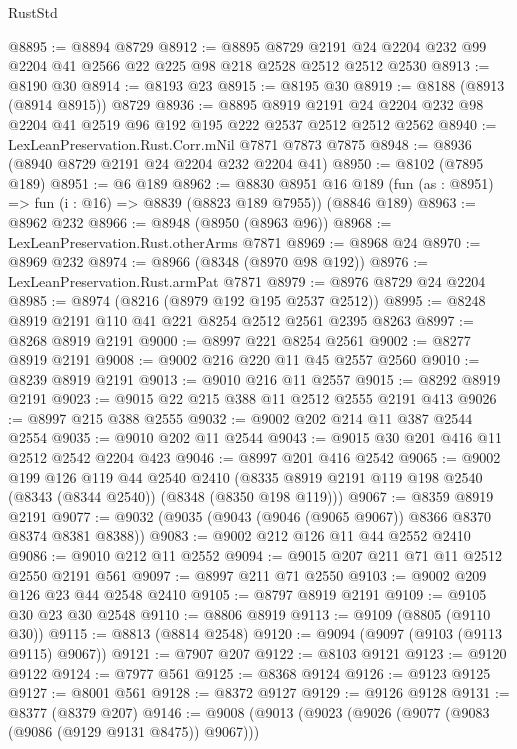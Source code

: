 \begin{lexlean}{RustStd}
\begin{coremodule}
{\begin{coremodule}
{{{{{{{{{{{{{{{{{{{{{{{{{{{{{{{{{{{{{{{{{{{{{{{{{{@8895 := @8894 @8729
@8912 := @8895
    @8729
    @2191
    @24
    @2204
    @232
    @99
    @2204
    @41
    @2566
    @22
    @225
    @98
    @218
    @2528
    @2512
    @2512
    @2530
@8913 := @8190 @30
@8914 := @8193 @23
@8915 := @8195 @30
@8919 := @8188 (@8913 (@8914 @8915)) @8729
@8936 := @8895
    @8919
    @2191
    @24
    @2204
    @232
    @98
    @2204
    @41
    @2519
    @96
    @192
    @195
    @222
    @2537
    @2512
    @2512
    @2562
@8940 := LexLeanPreservation.Rust.Corr.mNil @7871 @7873 @7875
@8948 := @8936 (@8940 @8729 @2191 @24 @2204 @232 @2204 @41)
@8950 := @8102 (@7895 @189)
@8951 := @6 @189
@8962 := @8830
    @8951
    @16
    @189
    (fun (as : @8951) => fun (i : @16) => @8839 (@8823 @189 @7955))
    (@8846 @189)
@8963 := @8962 @232
@8966 := @8948 (@8950 (@8963 @96))
@8968 := LexLeanPreservation.Rust.otherArms @7871
@8969 := @8968 @24
@8970 := @8969 @232
@8974 := @8966 (@8348 (@8970 @98 @192))
@8976 := LexLeanPreservation.Rust.armPat @7871
@8979 := @8976 @8729 @24 @2204
@8985 := @8974 (@8216 (@8979 @192 @195 @2537 @2512))
@8995 := @8248 @8919 @2191 @110 @41 @221 @8254 @2512 @2561 @2395 @8263
@8997 := @8268 @8919 @2191
@9000 := @8997 @221 @8254 @2561
@9002 := @8277 @8919 @2191
@9008 := @9002 @216 @220 @11 @45 @2557 @2560
@9010 := @8239 @8919 @2191
@9013 := @9010 @216 @11 @2557
@9015 := @8292 @8919 @2191
@9023 := @9015 @22 @215 @388 @11 @2512 @2555 @2191 @413
@9026 := @8997 @215 @388 @2555
@9032 := @9002 @202 @214 @11 @387 @2544 @2554
@9035 := @9010 @202 @11 @2544
@9043 := @9015 @30 @201 @416 @11 @2512 @2542 @2204 @423
@9046 := @8997 @201 @416 @2542
@9065 := @9002
    @199
    @126
    @119
    @44
    @2540
    @2410
    (@8335 @8919 @2191 @119 @198 @2540 (@8343 (@8344 @2540)) (@8348 (@8350 @198 @119)))
@9067 := @8359 @8919 @2191
@9077 := @9032 (@9035 (@9043 (@9046 (@9065 @9067)) @8366 @8370 @8374 @8381 @8388))
@9083 := @9002 @212 @126 @11 @44 @2552 @2410
@9086 := @9010 @212 @11 @2552
@9094 := @9015 @207 @211 @71 @11 @2512 @2550 @2191 @561
@9097 := @8997 @211 @71 @2550
@9103 := @9002 @209 @126 @23 @44 @2548 @2410
@9105 := @8797 @8919 @2191
@9109 := @9105 @30 @23 @30 @2548
@9110 := @8806 @8919
@9113 := @9109 (@8805 (@9110 @30))
@9115 := @8813 (@8814 @2548)
@9120 := @9094 (@9097 (@9103 (@9113 @9115) @9067))
@9121 := @7907 @207
@9122 := @8103 @9121
@9123 := @9120 @9122
@9124 := @7977 @561
@9125 := @8368 @9124
@9126 := @9123 @9125
@9127 := @8001 @561
@9128 := @8372 @9127
@9129 := @9126 @9128
@9131 := @8377 (@8379 @207)
@9146 := @9008
    (@9013
      (@9023
        (@9026 (@9077 (@9083 (@9086 (@9129 @9131 @8475)) @9067)))
}}}}}}}}}}}}}}}}}}}}}}}}}}}}}}}}}}}}}}}}}}}}}}}}}}
\end{coremodule}}
\end{coremodule}
\end{lexlean}
